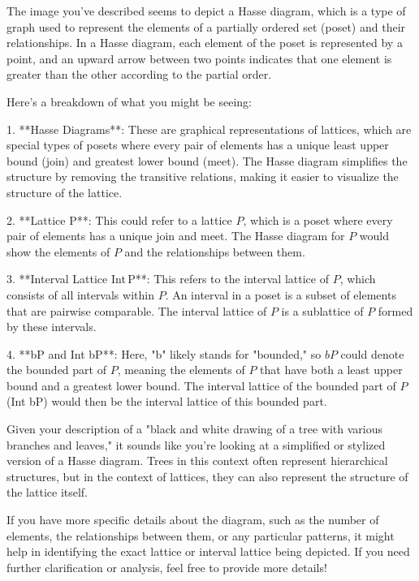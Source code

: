 The image you've described seems to depict a Hasse diagram, which is a type of graph used to represent the elements of a partially ordered set (poset) and their relationships. In a Hasse diagram, each element of the poset is represented by a point, and an upward arrow between two points indicates that one element is greater than the other according to the partial order.

Here's a breakdown of what you might be seeing:

1. **Hasse Diagrams**: These are graphical representations of lattices, which are special types of posets where every pair of elements has a unique least upper bound (join) and greatest lower bound (meet). The Hasse diagram simplifies the structure by removing the transitive relations, making it easier to visualize the structure of the lattice.

2. **Lattice P**: This could refer to a lattice \( P \), which is a poset where every pair of elements has a unique join and meet. The Hasse diagram for \( P \) would show the elements of \( P \) and the relationships between them.

3. **Interval Lattice Int\,P**: This refers to the interval lattice of \( P \), which consists of all intervals within \( P \). An interval in a poset is a subset of elements that are pairwise comparable. The interval lattice of \( P \) is a sublattice of \( P \) formed by these intervals.

4. **bP and Int bP**: Here, "b" likely stands for "bounded," so \( bP \) could denote the bounded part of \( P \), meaning the elements of \( P \) that have both a least upper bound and a greatest lower bound. The interval lattice of the bounded part of \( P \) (Int bP) would then be the interval lattice of this bounded part.

Given your description of a "black and white drawing of a tree with various branches and leaves," it sounds like you're looking at a simplified or stylized version of a Hasse diagram. Trees in this context often represent hierarchical structures, but in the context of lattices, they can also represent the structure of the lattice itself.

If you have more specific details about the diagram, such as the number of elements, the relationships between them, or any particular patterns, it might help in identifying the exact lattice or interval lattice being depicted. If you need further clarification or analysis, feel free to provide more details!